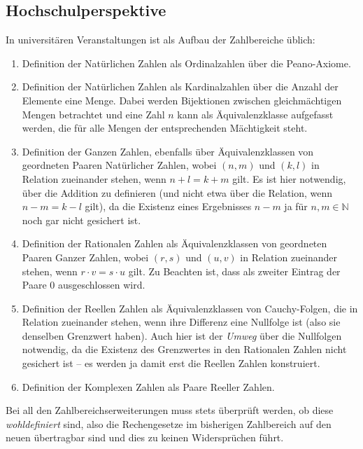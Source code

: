\documentclass[
  ngerman,
]{scrbook}
\providecommand{\tightlist}{%
  \setlength{\itemsep}{0pt}\setlength{\parskip}{0pt}}
\theoremstyle{definition}
\theoremstyle{definition}
\theoremstyle{definition}
\theoremstyle{definition}
\theoremstyle{remark}
\begin{document}
\hypertarget{hochschulperspektive}{%
\subsection{Hochschulperspektive}\label{hochschulperspektive}}

In universitären Veranstaltungen ist als Aufbau der Zahlbereiche üblich:

\begin{enumerate}
\def\labelenumi{\arabic{enumi}.}
\tightlist
\item
  Definition der Natürlichen Zahlen als Ordinalzahlen über die Peano-Axiome.
\item
  Definition der Natürlichen Zahlen als Kardinalzahlen über die Anzahl der Elemente eine Menge. Dabei werden Bijektionen zwischen gleichmächtigen Mengen betrachtet und eine Zahl \(n\) kann als Äquivalenzklasse aufgefasst werden, die für alle Mengen der entsprechenden Mächtigkeit steht.
\item
  Definition der Ganzen Zahlen, ebenfalls über Äquivalenzklassen von geordneten Paaren Natürlicher Zahlen, wobei \((n,m)\) und \((k,l)\) in Relation zueinander stehen, wenn \(n+l = k+m\) gilt. Es ist hier notwendig, über die Addition zu definieren (und nicht etwa über die Relation, wenn \(n-m = k-l\) gilt), da die Existenz eines Ergebnisses \(n-m\) ja für \(n,m\in\mathbb{N}\) noch gar nicht gesichert ist.
\item
  Definition der Rationalen Zahlen als Äquivalenzklassen von geordneten Paaren Ganzer Zahlen, wobei \((r,s)\) und \((u,v)\) in Relation zueinander stehen, wenn \(r\cdot v = s\cdot u\) gilt. Zu Beachten ist, dass als zweiter Eintrag der Paare \(0\) ausgeschlossen wird.
\item
  Definition der Reellen Zahlen als Äquivalenzklassen von Cauchy-Folgen, die in Relation zueinander stehen, wenn ihre Differenz eine Nullfolge ist (also sie denselben Grenzwert haben). Auch hier ist der \emph{Umweg} über die Nullfolgen notwendig, da die Existenz des Grenzwertes in den Rationalen Zahlen nicht gesichert ist -- es werden ja damit erst die Reellen Zahlen konstruiert.
\item
  Definition der Komplexen Zahlen als Paare Reeller Zahlen.
\end{enumerate}

Bei all den Zahlbereichserweiterungen muss stets überprüft werden, ob diese \emph{wohldefiniert} sind, also die Rechengesetze im bisherigen Zahlbereich auf den neuen übertragbar sind und dies zu keinen Widersprüchen führt.
\end{document}
